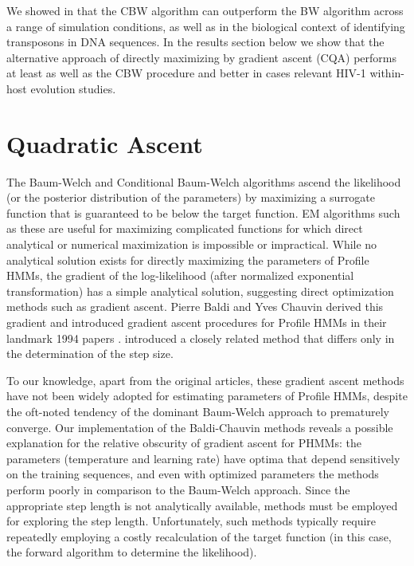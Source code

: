 \documentclass[preprint,12pt,authoryear]{elsarticle}
\begin{document}
We showed in \cite{edlefsen2010transposon} that the
CBW algorithm can outperform the BW algorithm across a range of
simulation conditions, as well as in the biological context of
identifying transposons in DNA sequences.  In the results section below we show that the alternative approach of directly maximizing by gradient ascent (CQA) performs at least as well as the CBW procedure and better in cases relevant HIV-1 within-host evolution studies.

\section{Quadratic Ascent}
The Baum-Welch and Conditional Baum-Welch algorithms ascend the
likelihood (or the posterior distribution of the parameters) by
maximizing a surrogate function that is guaranteed to be below the
target function.  EM algorithms such as these are useful for maximizing complicated
functions for which direct analytical or numerical maximization is
impossible or impractical.  While no analytical solution exists for
directly maximizing the parameters of Profile HMMs, the gradient of
the log-likelihood (after normalized exponential transformation) has a simple
analytical solution, suggesting direct optimization methods such as gradient
ascent.  Pierre Baldi and Yves Chauvin derived
this gradient and introduced gradient ascent procedures for Profile HMMs in their
landmark 1994 papers \citep{Baldi:1994, baldi1994smooth}.  \cite{Mamitsuka:1996, Mamitsuka:1998} introduced a closely related method that differs only in the
determination of the step size.


To our knowledge, apart from the original articles, these gradient
ascent methods have not been widely adopted for estimating parameters
of Profile HMMs, despite the oft-noted tendency of the dominant
Baum-Welch approach to prematurely converge.  Our implementation of
the Baldi-Chauvin methods reveals a possible explanation for the
relative obscurity of gradient ascent for PHMMs: the parameters
(temperature and learning rate) have optima that depend sensitively on
the training sequences, and even with optimized parameters the methods
perform poorly in comparison to the Baum-Welch approach.  Since the
appropriate step length is not analytically available, methods must be
employed for exploring the step length.  Unfortunately, such methods
typically require repeatedly employing a costly recalculation of the
target function (in this case, the forward algorithm to determine the
likelihood).
\end{document}
